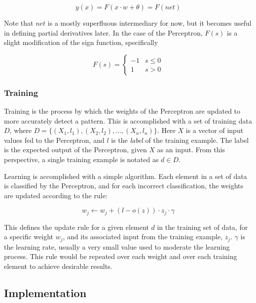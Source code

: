 \documentclass[a4paper, 11pt]{article} %
\begin{document}
\begin{equation}
y(x) = F(x \cdot w + \theta ) = F(net)
\end{equation}

Note that $net$ is a mostly superfluous intermediary for now, but it becomes useful in defining partial derivatives later.  In the case of the Perceptron, $F(s)$ is a slight modification of the sign function, specifically

\begin{equation}
F(s) = 
\begin{cases}
	-1 & s\leq 0 \\
	1        & s>0
\end{cases}
\end{equation}

\subsubsection*{Training}

Training is the process by which the weights of the Perceptron are updated to more accurately detect a pattern.  This is accomplished with a set of training data $D$, where $D = \{ (X_1,l_1),(X_2,l_2),...,(X_n,l_n) \}$.  Here $X$ is a vector of input values fed to the Perceptron, and $l$ is the \textit{label} of the training example.  The label is the expected output of the Perceptron, given $X$ as an input.  From this perspective, a single training example is notated as $d \in D$.

Learning is accomplished with a simple algorithm.  Each element in a set of data is classified by the Perceptron, and for each incorrect classification, the weights are updated according to the rule:

\begin{equation}
w_j \leftarrow w_j + (l - o(z)) \cdot z_j \cdot \gamma
\end{equation}

This defines the update rule for a given element $d$ in the training set of data, for a specific weight $w_j$, and its associated input from the training example, $z_j$.  $\gamma$ is the learning rate, usually a very small value used to moderate the learning process.  This rule would be repeated over each weight and over each training element to achieve desirable results.

\subsection*{Implementation}
\end{document}
